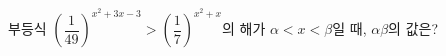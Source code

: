 부등식 $\left(\dfrac{1}{49}\right)^{x^2+3x-3}>\left(\dfrac{1}{7}\right)^{x^2+x}$의 해가 $\alpha<x<\beta$일 때, $\alpha\beta$의 값은?
